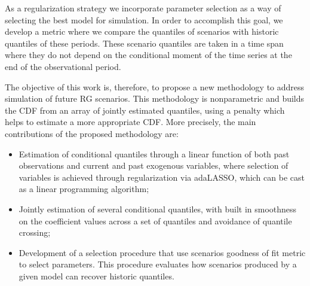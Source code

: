 As a regularization strategy we incorporate parameter selection as a way of selecting the best model for simulation. In order to accomplish this goal, we develop a metric where we compare the quantiles of scenarios with historic quantiles of these periods. These scenario quantiles are taken in a time span where they do not depend on the conditional moment of the time series at the end of the observational period. 
 
The objective of this work is, therefore, to propose a new methodology to address simulation of future RG scenarios. This methodology is nonparametric and builds the CDF from an array of jointly estimated quantiles, using a penalty which helps to estimate a more appropriate CDF. More precisely, the main contributions of the proposed methodology are:
\begin{itemize}
	\item Estimation of conditional quantiles through a linear function of both past observations and current and past exogenous variables, where selection of variables is achieved through regularization via adaLASSO, which can be cast as a linear programming algorithm;
	\item  Jointly estimation of several conditional quantiles, with built in smoothness on the coefficient values across a set of quantiles and avoidance of quantile crossing;
	\item Development of a selection procedure that use scenarios goodness of fit metric to select parameters. This procedure evaluates how scenarios produced by a given model can recover historic quantiles.
	
\end{itemize}




